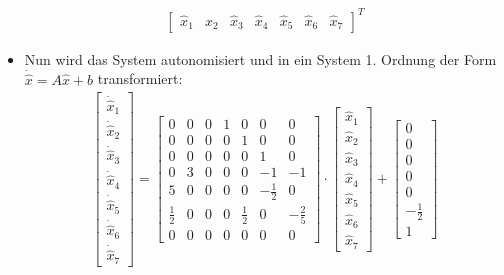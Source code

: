 \begin{itemize}
\begin{align*}
							\begin{bmatrix}
								\hat{x} _ 1 & \hat{x} _ 2 & \hat{x} _ 3 & \hat{x} _ 4 & \hat{x} _ 5 & \hat{x} _ 6 & \hat{x} _ 7
							\end{bmatrix} ^ T
						\end{align*}
					\item Nun wird das System autonomisiert und in ein System 1. Ordnung der Form \( \dot{\hat{x}} = A \hat{x} + b \) transformiert:
						\begin{align*}
							\begin{bmatrix}
								\dot{\hat{x}} _ 1 \\
								\dot{\hat{x}} _ 2 \\
								\dot{\hat{x}} _ 3 \\
								\dot{\hat{x}} _ 4 \\
								\dot{\hat{x}} _ 5 \\
								\dot{\hat{x}} _ 6 \\
								\dot{\hat{x}} _ 7
							\end{bmatrix}
							=
							\begin{bmatrix}
								0           & 0 & 0 & 1 & 0           & 0            & 0            \\
								0           & 0 & 0 & 0 & 1           & 0            & 0            \\
								0           & 0 & 0 & 0 & 0           & 1            & 0            \\
								0           & 3 & 0 & 0 & 0           & -1           & -1           \\
								5           & 0 & 0 & 0 & 0           & -\frac{1}{2} & 0            \\
								\frac{1}{2} & 0 & 0 & 0 & \frac{1}{2} & 0            & -\frac{2}{5} \\
								0           & 0 & 0 & 0 & 0           & 0            & 0
							\end{bmatrix}
							\cdot
							\begin{bmatrix}
								\hat{x} _ 1 \\
								\hat{x} _ 2 \\
								\hat{x} _ 3 \\
								\hat{x} _ 4 \\
								\hat{x} _ 5 \\
								\hat{x} _ 6 \\
								\hat{x} _ 7
							\end{bmatrix}
							+
							\begin{bmatrix}
								0            \\
								0            \\
								0            \\
								0            \\
								0            \\
								-\frac{1}{2} \\
								1
							\end{bmatrix}
						\end{align*}
				\end{itemize}


